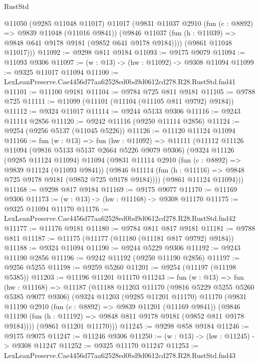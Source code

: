 \begin{lexlean}{RustStd}
\begin{coremodule}
        @11050
        (@9285 @11048 @11017)
        @11017
        (@9831
          @11037
          @2910
          (fun (c : @8892) => @9839 @11048 (@11016 @9841))
          (@9846 @11037 (fun (h : @11039) => @9848 @641 @9178 @9181 (@9852 @641 @9178 @9184))))
        (@9861 @11048 @11017)))
@11092 := @9298 @811 @9184
@11093 := @9175 @9079
@11094 := @11093 @9306
@11097 := (w : @13) -> (hw : @11092) -> @9308 @11094
@11099 := @9325 @11017 @11094
@11100 := LexLeanPreserve.Cae4456d77aa62528ed0bd9d0612cd278.R28.RustStd.fnd41
@11101 := @11100 @9181
@11104 := @9784 @725 @811 @9181
@11105 := @9788 @725
@11111 := @11099 (@11101 (@11104 (@11105 @811 @9792) @9184))
@11112 := @9324 @11017
@11114 := @9244 @5133 @9306
@11116 := @9243 @11114 @2856
@11120 := @9242 @11116 (@9250 @11114 @2856)
@11124 := @9254 (@9256 @5137 (@11045 @5226))
@11126 := @11120 @11124 @11094
@11166 := fun (w : @13) =>
  fun (hw : @11092) =>
  @11111
    (@11112
      @11126
      @11094
      (@9816 @5133 @5137 @2664 @5226 @9079 @9306)
      (@9324
        @11126
        (@9285 @11124 @11094)
        @11094
        (@9831
          @11114
          @2910
          (fun (c : @8892) => @9839 @11124 (@11093 @9841))
          (@9846 @11114 (fun (h : @11116) => @9848 @725 @9178 @9181 (@9852 @725 @9178 @9184))))
        (@9861 @11124 @11094)))
@11168 := @9298 @817 @9184
@11169 := @9175 @9077
@11170 := @11169 @9306
@11173 := (w : @13) -> (hw : @11168) -> @9308 @11170
@11175 := @9325 @11094 @11170
@11176 := LexLeanPreserve.Cae4456d77aa62528ed0bd9d0612cd278.R28.RustStd.fnd42
@11177 := @11176 @9181
@11180 := @9784 @811 @817 @9181
@11181 := @9788 @811
@11187 := @11175 (@11177 (@11180 (@11181 @817 @9792) @9184))
@11188 := @9324 @11094
@11190 := @9244 @5229 @9306
@11192 := @9243 @11190 @2856
@11196 := @9242 @11192 (@9250 @11190 @2856)
@11197 := @9256 @5255
@11198 := @9259 @5260
@11201 := @9254 (@11197 (@11198 @5385))
@11203 := @11196 @11201 @11170
@11243 := fun (w : @13) =>
  fun (hw : @11168) =>
  @11187
    (@11188
      @11203
      @11170
      (@9816 @5229 @5255 @5260 @5385 @9077 @9306)
      (@9324
        @11203
        (@9285 @11201 @11170)
        @11170
        (@9831
          @11190
          @2910
          (fun (c : @8892) => @9839 @11201 (@11169 @9841))
          (@9846 @11190 (fun (h : @11192) => @9848 @811 @9178 @9181 (@9852 @811 @9178 @9184))))
        (@9861 @11201 @11170)))
@11245 := @9298 @858 @9184
@11246 := @9175 @9075
@11247 := @11246 @9306
@11250 := (w : @13) -> (hw : @11245) -> @9308 @11247
@11252 := @9325 @11170 @11247
@11253 := LexLeanPreserve.Cae4456d77aa62528ed0bd9d0612cd278.R28.RustStd.fnd43

\end{coremodule}
\end{lexlean}
